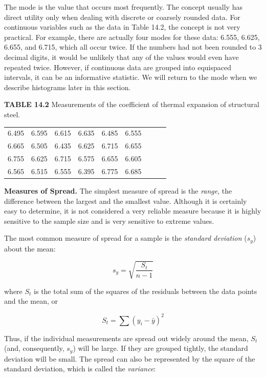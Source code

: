 \documentclass[../main.tex]{subfiles}
\begin{document}
The mode is the value that occurs most frequently. The concept usually has direct utility only when dealing with discrete or coarsely rounded data. For continuous variables such
as the data in Table 14.2, the concept is not very practical. For example, there are actually four modes for these data: 6.555, 6.625, 6.655, and 6.715, which all occur twice. If the numbers had not been rounded to 3 decimal digits, it would be unlikely that any of the values
would even have repeated twice. However, if continuous data are grouped into equispaced
intervals, it can be an informative statistic. We will return to the mode when we describe histograms later in this section.

\noindent \textbf{TABLE 14.2}	 \quad Measurements of the coefficient of thermal expansion of structural steel.

\begin{tabular}{ccccccccc}
	6.495 & 6.595 & 6.615 & 6.635 & 6.485 & 6.555 \\
	6.665 & 6.505 & 6.435 & 6.625 & 6.715 & 6.655 \\
	6.755 & 6.625 & 6.715 & 6.575 & 6.655 & 6.605 \\
	6.565 & 6.515 & 6.555 & 6.395 & 6.775 & 6.685
\end{tabular}

\noindent \textbf{Measures of Spread. } \quad  The simplest measure of spread is the \textit{range}, the difference between the largest and the smallest value. Although it is certainly easy to determine, it is not
considered a very reliable measure because it is highly sensitive to the sample size and is
very sensitive to extreme values.

The most common measure of spread for a sample is the \textit{standard deviation} ($s_ y$) about
the mean:

\begin{equation}
	\tag{14.3}
	s_y = \sqrt{\frac{S_t}{n-1}}
\end{equation}

\noindent where $S_t$ is the total sum of the squares of the residuals between the data points and the
mean, or

\begin{equation}
	\tag{14.4}
	S_t = \sum (y_i - \bar{y})^2
\end{equation}

\noindent Thus, if the individual measurements are spread out widely around the mean, $S_t$ (and, consequently, $s_y$) will be large. If they are grouped tightly, the standard deviation will be small.
The spread can also be represented by the square of the standard deviation, which is called
the \textit{variance}:
\end{document}
